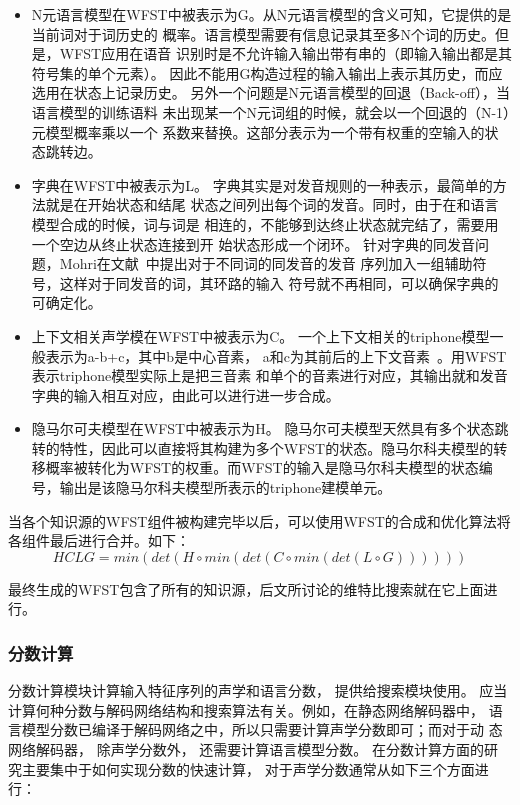 \begin{itemize}
\item N元语言模型在WFST中被表示为G。从N元语言模型的含义可知，它提供的是当前词对于词历史的
概率。语言模型需要有信息记录其至多N个词的历史。但是，WFST应用在语音
识别时是不允许输入输出带有串的（即输入输出都是其符号集的单个元素）。
因此不能用G构造过程的输入输出上表示其历史，而应选用在状态上记录历史。
另外一个问题是N元语言模型的回退（Back-off），当语言模型的训练语料
未出现某一个N元词组的时候，就会以一个回退的（N-1）元模型概率乘以一个
系数来替换。这部分表示为一个带有权重的空输入的状态跳转边。

\item 字典在WFST中被表示为L。
字典其实是对发音规则的一种表示，最简单的方法就是在开始状态和结尾
状态之间列出每个词的发音。同时，由于在和语言模型合成的时候，词与词是
相连的，不能够到达终止状态就完结了，需要用一个空边从终止状态连接到开
始状态形成一个闭环。
针对字典的同发音问题，Mohri在文献~\cite{mohri2002weighted}中提出对于不同词的同发音的发音
序列加入一组辅助符号，这样对于同发音的词，其环路的输入
符号就不再相同，可以确保字典的可确定化。

\item 上下文相关声学模在WFST中被表示为C。
一个上下文相关的triphone模型一般表示为a-b+c，其中b是中心音素，
a和c为其前后的上下文音素~\cite{seide2011conversational}。用WFST表示triphone模型实际上是把三音素
和单个的音素进行对应，其输出就和发音字典的输入相互对应，由此可以进行进一步合成。

\item 隐马尔可夫模型在WFST中被表示为H。
隐马尔可夫模型天然具有多个状态跳转的特性，因此可以直接将其构建为多个WFST的状态。隐马尔科夫模型的转移概率被转化为WFST的权重。而WFST的输入是隐马尔科夫模型的状态编号，输出是该隐马尔科夫模型所表示的triphone建模单元。
\end{itemize}

当各个知识源的WFST组件被构建完毕以后，可以使用WFST的合成和优化算法将各组件最后进行合并。如下：
\begin{equation}
HCLG = min(det(H \circ min(det(C \circ min(det(L \circ G))))))
\end{equation}

最终生成的WFST包含了所有的知识源，后文所讨论的维特比搜索就在它上面进行。

\subsubsection{分数计算}

分数计算模块计算输入特征序列的声学和语言分数， 提供给搜索模块使用。
应当计算何种分数与解码网络结构和搜索算法有关。例如，在静态网络解码器中，
语言模型分数已编译于解码网络之中，所以只需要计算声学分数即可；而对于动
态网络解码器， 除声学分数外， 还需要计算语言模型分数。 在分数计算方面的研
究主要集中于如何实现分数的快速计算， 对于声学分数通常从如下三个方面进行：

